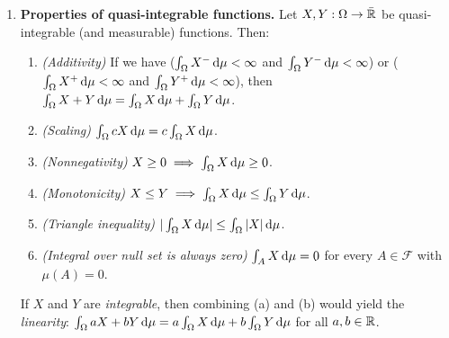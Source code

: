 \begin{enumerate}
\item \label{it:quasi-int-prop}\textbf{Properties of quasi-integrable functions.} Let
\(X,Y:\Omega\to\bar{\mathbb{R}}\) be quasi-integrable (and measurable) functions. Then:
\begin{enumerate}
\item \emph{(Additivity)} If we have (\(\int_{\Omega}^{}X^{-}\odif{\mu}<\infty\) and
\(\int_{\Omega}^{}Y^{-}\odif{\mu}<\infty\)) or
(\(\int_{\Omega}^{}X^{+}\odif{\mu}<\infty\) and
\(\int_{\Omega}^{}Y^{+}\odif{\mu}<\infty\)), then \(\int_{\Omega}^{}X+Y\odif{\mu}
=\int_{\Omega}^{}X\odif{\mu}+\int_{\Omega}^{}Y\odif{\mu}\).
\item \emph{(Scaling)} \(\int_{\Omega}^{}cX\odif{\mu}=c\int_{\Omega}^{}X\odif{\mu}\).
\item \emph{(Nonnegativity)} \(X\ge 0\implies \int_{\Omega}^{}X\odif{\mu}\ge 0\).
\item \emph{(Monotonicity)} \(X\le Y\implies \int_{\Omega}^{}X\odif{\mu}\le\int_{\Omega}^{}Y\odif{\mu}\).
\item \emph{(Triangle inequality)} \(|\int_{\Omega}^{}X\odif{\mu}|\le\int_{\Omega}^{}|X|\odif{\mu}\).
\item \emph{(Integral over null set is always zero)}
\(\int_{A}^{}X\odif{\mu}=0\) for every \(A\in\mathcal{F}\) with \(\mu(A)=0\).
\end{enumerate}
\begin{note}
If \(X\) and \(Y\) are \emph{integrable}, then combining (a) and (b) would
yield the \emph{linearity}:
\(\int_{\Omega}^{}aX+bY\odif{\mu}=a\int_{\Omega}^{}X\odif{\mu}+b\int_{\Omega}^{}Y\odif{\mu}\)
for all \(a,b\in\mathbb{R}\).
\end{note}


\end{enumerate}
